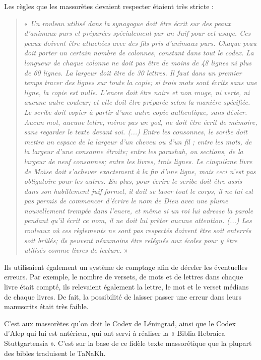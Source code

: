 \begin{small}
Les règles que les massorètes devaient respecter étaient très stricte :

\begin{quote}
« \emph{Un rouleau utilisé dans la synagogue doit être écrit sur des peaux d’animaux purs et préparées spécialement par un Juif pour cet usage. Ces peaux doivent être attachées avec des fils pris d’animaux purs. Chaque peau doit porter un certain nombre de colonnes, constant dans tout le codex. La longueur de chaque colonne ne doit pas être de moins de 48 lignes ni plus de 60 lignes. La largeur doit être de 30 lettres. Il faut dans un premier temps tracer des lignes sur toute la copie; si trois mots sont écrits sans une ligne, la copie est nulle. L’encre doit être noire et non rouge, ni verte, ni aucune autre couleur; et elle doit être préparée selon la manière spécifiée. Le scribe doit copier à partir d’une autre copie authentique, sans dévier. Aucun mot, aucune lettre, même pas un yod, ne doit être écrit de mémoire, sans regarder le texte devant soi. (...) Entre les consonnes, le scribe doit mettre un espace de la largeur d’un cheveu ou d’un fil ; entre les mots, de la largeur d’une consonne étroite; entre les parashah, ou sections, de la largeur de neuf consonnes; entre les livres, trois lignes. Le cinquième livre de Moïse doit s’achever exactement à la fin d’une ligne, mais ceci n’est pas obligatoire pour les autres. En plus, pour écrire le scribe doit être assis dans son habillement juif formel, il doit se laver tout le corps, il ne lui est pas permis de commencer d’écrire le nom de Dieu avec une plume nouvellement trempée dans l’encre, et même si un roi lui adresse la parole pendant qu’il écrit ce nom, il ne doit lui prêter aucune attention. (...) Les rouleaux où ces règlements ne sont pas respectés doivent être soit enterrés soit brûlés; ils peuvent néanmoins être relégués aux écoles pour y être utilisés comme livres de lecture.} »
\end{quote}

Ils utilisaient également un système de comptage afin de déceler les éventuelles erreurs. Par exemple, le nombre de versets, de mots et de lettres dans chaque livre était compté, ils relevaient également la lettre, le mot et le verset médians de chaque livres. De fait, la possibilité de laisser passer une erreur dans leurs manuscrits était très faible.\bigskip

C'est aux massorètes qu'on doit le Codex de Léningrad, ainsi que le Codex d'Alep qui lui est antérieur, qui ont servi à réaliser la « Biblia Hebraica Stuttgartensia ». C'est sur la base de ce fidèle texte massorétique que la plupart des bibles traduisent le TaNaKh.


\end{small}
